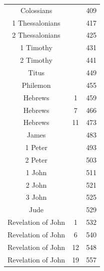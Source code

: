 \documentclass{article}
\newlength{\minipageheight}
\newlength{\minipagewidth}
\begin{document}
\begin{minipage}[l][\minipageheight][t]{\minipagewidth}
\begin{center}
\begin{tabular}{|c|c|c|}
            Colossians         &         & 409  \\
            1 Thessalonians    &         & 417  \\
            2 Thessalonians    &         & 425  \\
            1 Timothy          &         & 431  \\
            2 Timothy          &         & 441  \\
            Titus              &         & 449  \\
            Philemon           &         & 455  \\
            Hebrews            & 1       & 459  \\
            Hebrews            & 7       & 466  \\
            Hebrews            & 11      & 473  \\
            James              &         & 483  \\
            1 Peter            &         & 493  \\
            2 Peter            &         & 503  \\
            1 John             &         & 511  \\
            2 John             &         & 521  \\
            3 John             &         & 525  \\
            Jude               &         & 529  \\
            Revelation of John & 1       & 532  \\
            Revelation of John & 6       & 540  \\
            Revelation of John & 12      & 548  \\
            Revelation of John & 19      & 557  \\
            \hline
        \end{tabular}
    \end{center}
\end{minipage}%
%
%
\end{document}
